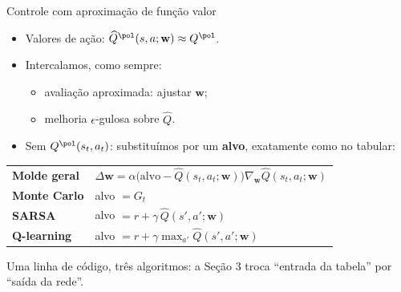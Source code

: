 \documentclass[aspectratio=169, 11pt]{beamer}
\newcommand{\Qhat}{\widehat{Q}}
\newcommand{\wv}{\mathbf{w}}
\begin{document}
\begin{frame}{Controle com aproximação de função valor}

  \begin{itemize}\setlength{\itemsep}{0.35ex}
    \item Valores de ação: $\Qhat^{\pol}(s,a;\wv) \approx Q^{\pol}$.
    \item Intercalamos, como sempre:
      \begin{itemize}\setlength{\itemsep}{0.15ex}
        \item avaliação aproximada: ajustar $\wv$;
        \item melhoria $\epsilon$-gulosa sobre $\Qhat$.
      \end{itemize}
    \item Sem $Q^{\pol}(s_t,a_t)$: substituímos por um \textbf{alvo},
      exatamente como no tabular:
  \end{itemize}

  \smallskip
  {\small
  \begin{tabular}{@{}ll@{}}
    \textbf{Molde geral} & $\Delta\wv = \alpha\bigl(\text{alvo} - \Qhat(s_t,a_t;\wv)\bigr)\nabla_{\wv}\Qhat(s_t,a_t;\wv)$\\[0.7ex]
    \textbf{Monte Carlo} & alvo $= G_t$ \\[0.5ex]
    \textbf{SARSA} & alvo $= r + \gamma\,\Qhat(s',a';\wv)$ \\[0.5ex]
    \textbf{Q-learning} & alvo $= r + \gamma \max_{a'} \Qhat(s',a';\wv)$ \\
  \end{tabular}}

  \smallskip
  {\small Uma linha de código, três algoritmos: a Seção 3 troca ``entrada
  da tabela'' por ``saída da rede''.}
\end{frame}
\end{document}
